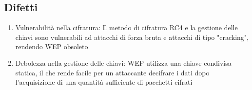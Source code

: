 \documentclass[10pt,oneside,a4paper]{article}
\begin{document}
\subsection{Difetti}
\begin{enumerate}
\item Vulnerabilità nella cifratura: Il metodo di cifratura RC4 e la gestione delle chiavi sono vulnerabili ad attacchi di forza bruta e attacchi di tipo "cracking", rendendo WEP obsoleto
\item Debolezza nella gestione delle chiavi: WEP utilizza una chiave condivisa statica, il che rende facile per un attaccante decifrare i dati dopo l'acquisizione di una quantità sufficiente di pacchetti cifrati
\end{enumerate}
\end{document}
